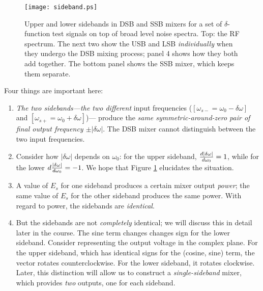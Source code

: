 \documentclass[11pt,preprint]{aastex}
\begin{document}
\begin{figure}[p!]
\hspace{-0.7in}
  \texttt{[image: sideband.ps]}
\caption{Upper and lower sidebands in DSB and SSB mixers for a set of
$\delta$-function test signals on top of broad level noise spectra. Top:
  the RF
spectrum. The next two show the USB and LSB {\it individually} when
they undergo the DSB mixing process; panel 4 shows how they both add
together. The bottom panel shows the SSB mixer, which keeps them
separate. \label{sideband}}
\end{figure}

        Four things are important here: \begin{enumerate}

        \item {\it The two sidebands---the two different} input
frequencies ($[\omega_{s-}= \omega_0 - \delta \omega]$ and $[\omega_{s+}=
\omega_0 + \delta \omega]$)--- produce the {\it same
symmetric-around-zero pair of final output frequency $\pm |\delta
\omega|$}. The DSB mixer
cannot distinguish between the two input frequencies.

        \item Consider how $|\delta \omega|$ depends on $\omega_0$: for
the upper sideband, ${d |\delta \omega| \over d\omega_0} = 1$, while for
the lower $d {|\delta \omega| \over d\omega_0} = -1$. We hope that
Figure
\ref{sideband} elucidates the
situation.

        \item A value of $E_s$ for one sideband produces a certain mixer
output {\it power}; the same value of $E_s$ for the other sideband
produces the same power. With regard to power, the sidebands are {\it
identical}.

        \item But the sidebands are not {\it completely} identical; we
	  will discuss this in detail later in the course. The sine term
	  changes changes sign for the lower sideband. Consider
	  representing the output voltage in the complex plane. For the
	  upper sideband, which has identical signs for the (cosine,
	  sine) term, the vector rotates counterclockwise. For the lower
	  sideband, it rotates clockwise. Later, this distinction will
	  allow us to construct a {\it single-sideband} mixer, which
	  provides {\it two} outputs, one for each sideband.

\end{enumerate}
\end{document}

